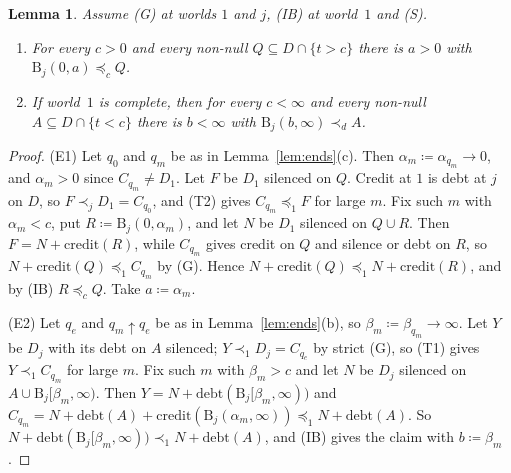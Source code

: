 \documentclass[11pt]{article}
\newtheorem{lemma}[theorem]{Lemma}
\theoremstyle{definition}\newtheorem{definition}[theorem]{Definition}
\theoremstyle{remark}\newtheorem{remark}[theorem]{Remark}
\newcommand{\debt}{\mathrm{debt}}
\newcommand{\cred}{\mathrm{credit}}
\newcommand{\Band}{\mathrm{B}}
\begin{document}
\begin{lemma}\label{lem:E12}
Assume (G) at worlds $1$ and $j$, (IB) at world~$1$ and (S).
\begin{enumerate}[label=(E\arabic*),leftmargin=*]
\item For every $c>0$ and every non-null $Q\subseteq D\cap\{t>c\}$ there is
$a>0$ with $\Band_j(0,a)\preceq_cQ$.
\item If world~$1$ is complete, then for every $c<\infty$ and every non-null
$A\subseteq D\cap\{t<c\}$ there is $b<\infty$ with
$\Band_j(b,\infty)\prec_dA$.
\end{enumerate}
\end{lemma}
\begin{proof}
(E1) Let $q_0$ and $q_m$ be as in Lemma~\ref{lem:ends}(c). Then
$\alpha_m\coloneqq\alpha_{q_m}\to0$, and $\alpha_m>0$ since $C_{q_m}\ne D_1$.
Let $F$ be $D_1$ silenced on $Q$. Credit at $1$ is debt at $j$ on $D$, so
$F\prec_jD_1=C_{q_0}$, and (T2) gives $C_{q_m}\preceq_1F$ for large $m$. Fix
such $m$ with $\alpha_m<c$, put $R\coloneqq\Band_j(0,\alpha_m)$, and let $N$
be $D_1$ silenced on $Q\cup R$. Then $F=N+\cred(R)$, while $C_{q_m}$ gives
credit on $Q$ and silence or debt on $R$, so $N+\cred(Q)\preceq_1C_{q_m}$ by
(G). Hence $N+\cred(Q)\preceq_1N+\cred(R)$, and by (IB) $R\preceq_cQ$. Take
$a\coloneqq\alpha_m$.

(E2) Let $q_e$ and $q_m\uparrow q_e$ be as in Lemma~\ref{lem:ends}(b), so
$\beta_m\coloneqq\beta_{q_m}\to\infty$. Let $Y$ be $D_j$ with its debt on $A$
silenced; $Y\prec_1D_j=C_{q_e}$ by strict (G), so (T1) gives
$Y\prec_1C_{q_m}$ for large $m$. Fix such $m$ with $\beta_m>c$ and let $N$ be
$D_j$ silenced on $A\cup\Band_j[\beta_m,\infty)$. Then
$Y=N+\debt(\Band_j[\beta_m,\infty))$ and
$C_{q_m}=N+\debt(A)+\cred(\Band_j(\alpha_m,\infty))\preceq_1N+\debt(A)$. So
$N+\debt(\Band_j[\beta_m,\infty))\prec_1N+\debt(A)$, and (IB) gives the claim
with $b\coloneqq\beta_m$.
\end{proof}
\end{document}
